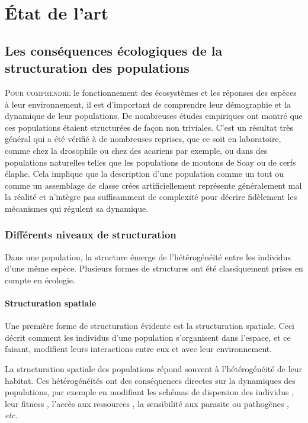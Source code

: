 \chapter{État de l'art}

\section{Les conséquences écologiques de la
structuration des populations}

\lettrine[lines=3]{P}{our comprendre} le fonctionnement des écosystèmes et les
réponses des espèces à leur environnement, il est d'important de comprendre leur démographie et la
dynamique de leur populations. De nombreuses études empiriques ont montré que
ces populations étaient structurées de façon non triviales. C'est un 
résultat très général qui a été vérifié à de nombreuses reprises, que ce soit en
laboratoire, comme chez la drosophile ou chez des acariens par exemple, ou dans
des populations naturelles telles que les populations de moutons de Soay
\autocite{coulson2001a} ou de cerfs élaphe. 
Cela implique que la description d'une population comme un tout ou comme
un assemblage de classe crées artificiellement représente généralement mal la
réalité et n'intègre pas suffisamment de complexité pour décrire fidèlement les
mécanismes qui régulent sa dynamique.

\subsection{Différents niveaux de structuration}

Dans une population, la structure émerge de l'hétérogénéité entre les
individus d'une même espèce. Plusieurs formes de structures ont été
classiquement prises en compte en écologie.

\subsubsection{Structuration spatiale}

Une première forme de structuration évidente est la structuration spatiale. Ceci
décrit comment les individus d'une population s'organisent dans l'espace, et ce
faisant, modifient leurs interactions entre eux et avec leur environnement. 

La structuration spatiale des populations répond souvent à l'hétérogénéité de
leur habitat. Ces hétérogénéités ont des conséquences directes sur la dynamiques
des populations, par exemple en modifiant les schémas de dispersion des
individus \autocite{hiebeler2000a}, leur fitness \autocite{zajkac2008a},
l'accès aux ressources \autocite{burger2008a}, la sensibilité aux parasite ou
pathogènes \autocite{su2009a}, \textit{etc}.

